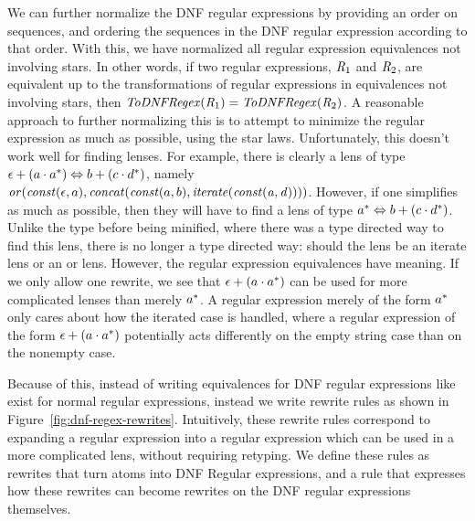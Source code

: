 We can further normalize the DNF regular expressions by providing an order on sequences,
and ordering the sequences in the DNF regular expression according to that order.
With this, we have normalized all regular expression equivalences not involving stars.
In other words, if two regular expressions, $\mathit{R}_1$ and $\mathit{R}_2$,
are equivalent up to the transformations of regular expressions in equivalences
not involving stars,
then $\mathit{ToDNFRegex}(\mathit{R}_1)=\mathit{ToDNFRegex}(\mathit{R}_2)$.
A reasonable approach to further normalizing this is to attempt to minimize the
regular expression as much as possible, using the star laws.
Unfortunately, this doesn't work
well for finding lenses.  For example, there is clearly a lens of type
$\epsilon+(a\cdot a^*) \Leftrightarrow b+(c\cdot d^*)$,
namely $\mathit{or}(\mathit{const}(\epsilon,a),\mathit{concat}(\mathit{const}(a,b),\mathit{iterate(\mathit{const}(a,d))}))$.
However, if one simplifies as much as possible, then they will have to find a lens
of type $a^* \Leftrightarrow b+(c\cdot d^*)$.
Unlike the type before being minified, where there was a type directed way to find
this lens, there is no longer a type directed way: should the lens be an iterate lens
or an or lens.
However, the regular expression equivalences have meaning.
If we only allow one rewrite, we see that
$\epsilon+(a\cdot a^*)$ can be used for more
complicated lenses than merely $a^*$.
A regular expression merely of the form $a^*$ only cares about how the iterated case is handled, where a regular expression of the form
$\epsilon+(a\cdot a^*)$ potentially acts differently on the empty
string case than on the nonempty case.


Because of this, instead of writing equivalences for DNF regular expressions like
exist for normal regular expressions,
instead we write rewrite rules as shown in
Figure~\ref{fig:dnf-regex-rewrites}.
Intuitively, these rewrite rules correspond to expanding a regular expression
into a regular expression which can be used in a more complicated lens, without requiring retyping.
We define these rules as rewrites that turn atoms into DNF Regular expressions,
and a rule that expresses how these rewrites can become rewrites on
the DNF regular expressions themselves.  


